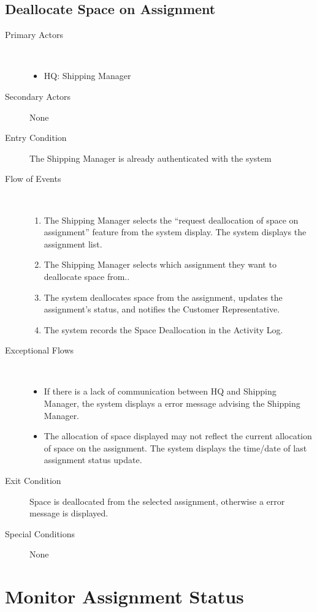 \documentclass[a4paper,10pt]{report}
\begin{document}
\section{Deallocate Space on Assignment}
\begin{description}
\item[Primary Actors] \
  \begin{itemize}
    \item HQ: Shipping Manager
  \end{itemize}
\item[Secondary Actors] None
\item[Entry Condition]
  The Shipping Manager is already authenticated with the system
\item[Flow of Events] \
  \begin{enumerate}
    \item The Shipping Manager selects the ``request deallocation of space on assignment'' feature from the system display. The system displays the assignment list.
    \item The Shipping Manager selects which assignment they want to deallocate space from..
    \item The system deallocates space from the assignment, updates the assignment's status, and notifies the Customer Representative.
    \item The system records the Space Deallocation in the Activity Log.
  \end{enumerate}
\item[Exceptional Flows] \
  \begin{itemize}
    \item If there is a lack of communication between HQ and Shipping Manager, the system displays a error message advising the Shipping Manager.
    \item The allocation of space displayed may not reflect the current allocation of space on the assignment. The system displays the time/date of last assignment status update.
  \end{itemize}
\item[Exit Condition]
 Space is deallocated from the selected assignment, otherwise a error message is displayed.
\item[Special Conditions] None
\end{description}

\chapter{Monitor Assignment Status}
\end{document}
